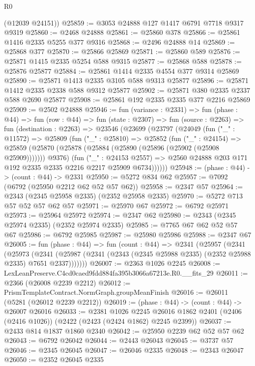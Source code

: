 \begin{lexlean}{R0}
\begin{coremodule}
      (@12039 @24151))
@25859 := @3053 @24888 @127 @1417 @6791 @7718 @9317 @9319
@25860 := @2468 @24888
@25861 := @25860 @378
@25866 := @25861 @1416 @2335 @5255 @377 @9316
@25868 := @2496 @24888 @14
@25869 := @25868 @377
@25870 := @25866 @25869
@25871 := @25860 @589
@25876 := @25871 @1415 @2335 @5254 @588 @9315
@25877 := @25868 @588
@25878 := @25876 @25877
@25884 := @25861 @1414 @2335 @4554 @377 @9314 @25869
@25890 := @25871 @1413 @2335 @3105 @588 @9313 @25877
@25896 := @25871 @1412 @2335 @2338 @588 @9312 @25877
@25902 := @25871 @380 @2335 @2337 @588 @2690 @25877
@25908 := @25861 @192 @2335 @2335 @377 @2216 @25869
@25909 := @2502 @24888
@25946 := fun (variance : @2331) =>
  fun (phase : @44) =>
  fun (row : @44) =>
  fun (state : @2307) =>
  fun (source : @2263) =>
  fun (destination : @2263) =>
  @23546
    (@23699
      (@23797
        (@24049
          (fun ("_" : @11572) =>
          @25809
            (fun ("_" : @25810) =>
            @25852
              (fun ("_" : @24154) =>
              @25859 (@25870 (@25878 (@25884 (@25890 (@25896 (@25902 (@25908 @25909))))))) @9376)
              (fun ("_" : @24153 @2557) =>
              @2560 @24888 @203 @171 @192 @2335 @2335 @2216 @2217 @25909 @6734))))))
@25948 := (phase : @44) -> (count : @44) -> @2331
@25950 := @5272 @834 @62
@25957 := @7092 (@6792 (@25950 @2212 @62 @52 @57 @62))
@25958 := @2347 @57
@25964 := @2343 (@2345 @25958 @2335) (@2352 @25958 @2335)
@25970 := @5272 @713 @57 @52 @57 @62 @57
@25971 := @25970 @67
@25972 := @6792 @25971
@25973 := @25964 @25972
@25974 := @2347 @62
@25980 := @2343 (@2345 @25974 @2335) (@2352 @25974 @2335)
@25985 := @7765 @67 @62 @52 @57 @67
@25986 := @6792 @25985
@25987 := @25980 @25986
@25988 := @2347 @67
@26005 := fun (phase : @44) =>
  fun (count : @44) =>
  @2341
    (@25957
      (@2341
        (@25973
          (@2341 (@25987 (@2341 (@2343 (@2345 @25988 @2335) (@2352 @25988 @2335) @7651 @2337)))))))
@26007 := @2363 @1026 @2245
@26008 := LexLeanPreserve.C4cd0caed9fdd884fa395b3066a67213e.R0.__fits_29
@26011 := @2366 (@26008 @2239 @2212)
@26012 := PrismTemplateContract.NormGraph.groupMeanFinish
@26016 := @26011 (@5281 (@26012 @2239 @2212))
@26019 := (phase : @44) -> (count : @44) -> @26007 @26016
@26033 := @2381
    @1026
    @2245
    @26016
    @1862
    @2401
    (@2406 (@2416 @1026))
    (@2422 (@2423 (@2424 @1862) @2245 @2399))
@26037 := @2433 @814 @1837 @1860 @2340
@26042 := @25950 @2239 @62 @52 @57 @62
@26043 := @6792 @26042
@26044 := @2443 @26043
@26045 := @3737 @57
@26046 := @2345 @26045
@26047 := @26046 @2335
@26048 := @2343 @26047
@26050 := @2352 @26045 @2335

\end{coremodule}
\end{lexlean}
